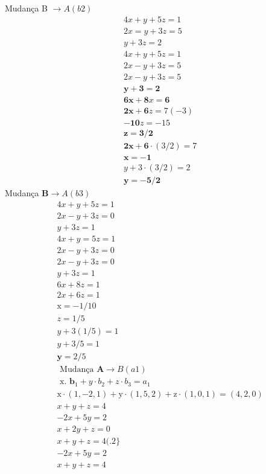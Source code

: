 \documentclass[10pt]{article}
\begin{document}
Mudança B $\rightarrow A(b 2)$
$$
\begin{aligned}
&4 x+y+5 z=1 \\
&2 x=y+3 z=5 \\
&y+3 z=2 \\
&4 x+y+5 z=1 \\
&2 x-y+3 z=5 \\
&2 x-y+3 z=5 \\
&\mathbf{y}+\mathbf{3}=\mathbf{2} \\
&\mathbf{6 x}+\mathbf{8} x=\mathbf{6} \\
&\mathbf{2 x}+\mathbf{6} z=7(-3) \\
&\mathbf{- 1 0} z=-15 \\
&\mathbf{z}=\mathbf{3} / \mathbf{2} \\
&\mathbf{2 x}+\mathbf{6} \cdot(3 / 2)=7 \\
&\mathbf{x}=-\mathbf{1} \\
&y+3 \cdot(3 / 2)=2 \\
&\mathbf{y}=-\mathbf{5} / \mathbf{2}
\end{aligned}
$$
Mudança $\mathbf{B} \rightarrow A(b 3)$
$$
\begin{aligned}
& 4 x+y+5 z=1 \\
& 2 x-y+3 z=0 \\
& y+3 z=1 \\
& 4 x+y=5 z=1 \\
& 2 x-y+3 z=0 \\
& 2 x-y+3 z=0 \\
& y+3 z=1 \\
& 6 x+8 z=1 \\
& 2 x+6 z=1 \\
& \mathrm{x}=-1 / 10 \\
& z=1 / 5 \\
& y+3(1 / 5)=1 \\
& y+3 / 5=1 \\
& \mathbf{y}=2 / 5 \\
& \text { Mudança } \mathbf{A} \rightarrow B(a 1) \\
& \text { x. } \mathbf{b}_{1}+y \cdot b_{2}+z \cdot b_{3}=a_{1} \\
& \mathrm{x} \cdot(1,-2,1)+\mathrm{y} \cdot(1,5,2)+\mathrm{z} \cdot(1,0,1)=(4,2,0) \\
& x+y+z=4 \\
& -2 x+5 y=2 \\
& x+2 y+z=0 \\
& x+y+z=4(.2\} \\
& -2 x+5 y=2 \\
& x+y+z=4 
\end{aligned}
$$
\end{document}
